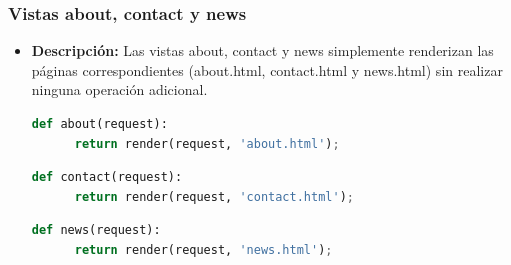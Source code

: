 \documentclass{article}
\begin{document}

  \subsubsection{Vistas about, contact y news}
  \begin{itemize}
    \item \textbf{Descripción: }Las vistas about, contact y news simplemente renderizan las páginas correspondientes (about.html, contact.html y news.html) 
    sin realizar ninguna operación adicional.
    \begin{lstlisting}[language=Python, caption={about}]
    def about(request):
      return render(request, 'about.html');
    \end{lstlisting}
    \begin{lstlisting}[language=Python, caption={contact}]
    def contact(request):
      return render(request, 'contact.html');
    \end{lstlisting}
    \begin{lstlisting}[language=Python, caption={news}]
    def news(request):
      return render(request, 'news.html');
    \end{lstlisting}
  \end{itemize}
  
\end{document}
